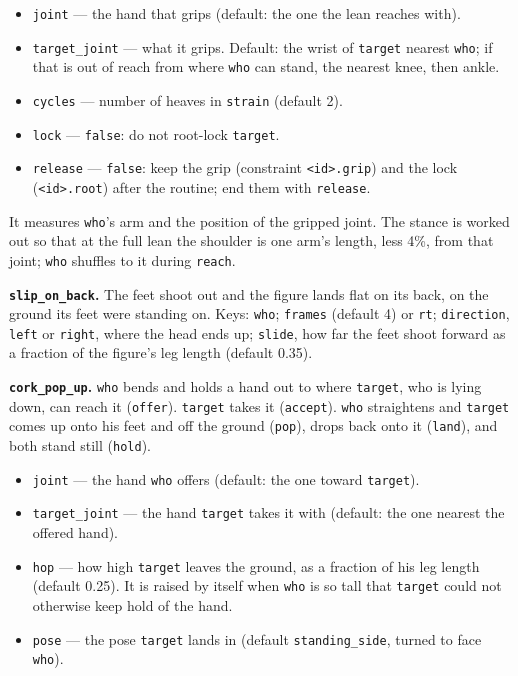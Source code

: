 \documentclass[
  12pt,
  letterpaper,
]{book}
\providecommand{\tightlist}{%
  \setlength{\itemsep}{0pt}\setlength{\parskip}{0pt}}
\begin{document}
\begin{itemize}
\tightlist
\item
  \texttt{joint} --- the hand that grips (default: the one the lean
  reaches with).
\item
  \texttt{target\_joint} --- what it grips. Default: the wrist of
  \texttt{target} nearest \texttt{who}; if that is out of reach from
  where \texttt{who} can stand, the nearest knee, then ankle.
\item
  \texttt{cycles} --- number of heaves in \texttt{strain} (default 2).
\item
  \texttt{lock} --- \texttt{false}: do not root-lock \texttt{target}.
\item
  \texttt{release} --- \texttt{false}: keep the grip (constraint
  \texttt{<id>.grip}) and the lock (\texttt{<id>.root}) after the
  routine; end them with \texttt{release}.
\end{itemize}

It measures \texttt{who}'s arm and the position of the gripped joint.
The stance is worked out so that at the full lean the shoulder is one
arm's length, less 4\%, from that joint; \texttt{who} shuffles to it
during \texttt{reach}.

\textbf{\texttt{slip\_on\_back}.} The feet shoot out and the figure
lands flat on its back, on the ground its feet were standing on. Keys:
\texttt{who}; \texttt{frames} (default 4) or \texttt{rt};
\texttt{direction}, \texttt{left} or \texttt{right}, where the head
ends up; \texttt{slide}, how far the feet shoot forward as a fraction
of the figure's leg length (default 0.35).

\textbf{\texttt{cork\_pop\_up}.} \texttt{who} bends and holds a hand
out to where \texttt{target}, who is lying down, can reach it
(\texttt{offer}). \texttt{target} takes it (\texttt{accept}).
\texttt{who} straightens and \texttt{target} comes up onto his feet and
off the ground (\texttt{pop}), drops back onto it (\texttt{land}), and
both stand still (\texttt{hold}).

\begin{itemize}
\tightlist
\item
  \texttt{joint} --- the hand \texttt{who} offers (default: the one
  toward \texttt{target}).
\item
  \texttt{target\_joint} --- the hand \texttt{target} takes it with
  (default: the one nearest the offered hand).
\item
  \texttt{hop} --- how high \texttt{target} leaves the ground, as a
  fraction of his leg length (default 0.25). It is raised by itself
  when \texttt{who} is so tall that \texttt{target} could not otherwise
  keep hold of the hand.
\item
  \texttt{pose} --- the pose \texttt{target} lands in (default
  \texttt{standing\_side}, turned to face \texttt{who}).
\end{itemize}
\end{document}
